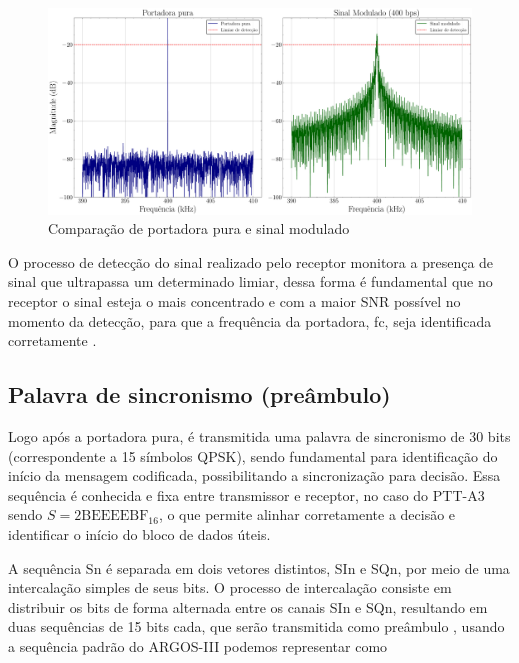 \begin{figure}[H]
	\centering
	\caption{Comparação de portadora pura e sinal modulado}\label{fig:portadora_pura_freq}
	\includegraphics[width=\linewidth]{assets/cap2/carrier_spectra.pdf}
\end{figure}

O processo de detecção do sinal realizado pelo receptor monitora a presença de sinal que ultrapassa um determinado limiar, dessa forma é fundamental que no receptor o sinal esteja o mais concentrado e com a maior \gls{SNR} possível no momento da detecção, para que a frequência da portadora, \gls{fc}, seja identificada corretamente \cite{cnes_services_and_message_formats_ed2_rev2_2006}.


\subsection{Palavra de sincronismo (preâmbulo)}\label{sec:preambulo}

Logo após a portadora pura, é transmitida uma palavra de sincronismo de 30 bits (correspondente a 15 símbolos \gls{QPSK}), sendo fundamental para identificação do início da mensagem codificada, possibilitando a sincronização para decisão. Essa sequência é conhecida e fixa entre transmissor e receptor, no caso do \gls{PTT-A3} sendo $S = \text{2BEEEEBF}_{16}$, o que permite alinhar corretamente a decisão e identificar o início do bloco de dados úteis. \cite{cnes_services_and_message_formats_ed2_rev2_2006}

A sequência \gls{Sn} é separada em dois vetores distintos, \gls{SIn} e \gls{SQn}, por meio de uma intercalação simples de seus bits. O processo de intercalação consiste em distribuir os bits de forma alternada entre os canais \gls{SIn} e \gls{SQn}, resultando em duas sequências de 15 bits cada, que serão transmitida como preâmbulo \cite{cnes_services_and_message_formats_ed2_rev2_2006}, usando a sequência padrão do \gls{ARGOS-III} podemos representar como

